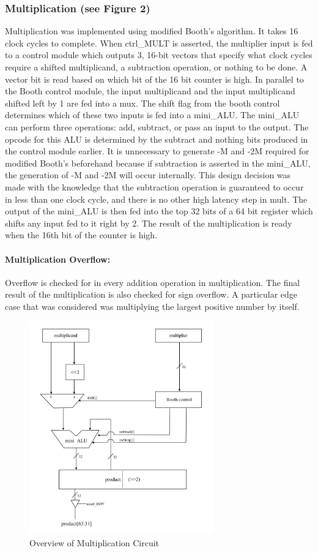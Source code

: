 \documentclass[letterpaper]{article}
\begin{document}
\subsubsection{Multiplication (see Figure 2)}
Multiplication was implemented using modified Booth's algorithm. It takes 16 clock cycles to complete. \newline 
When ctrl\_MULT is asserted, the multiplier input is fed to a control module which outputs 3, 16-bit vectors that specify what clock cycles require a shifted multiplicand, a subtraction operation, or nothing to be done. A vector bit is read based on which bit of the 16 bit counter is high. \newline
In parallel to the Booth control module, the input multiplicand and the input multiplicand shifted left by 1 are fed into a mux. The shift flag from the booth control determines which of these two inputs is fed into a mini\_ALU. The mini\_ALU can perform three operations: add, subtract, or pass an input to the output. The opcode for this ALU is determined by the subtract and nothing bits produced in the control module earlier. It is unnecessary to generate -M and -2M required for modified Booth's beforehand because if subtraction is asserted in the mini\_ALU, the generation of -M and -2M will occur internally. This design decision was made with the knowledge that the subtraction operation is guaranteed to occur in less than one clock cycle, and there is no other high latency step in mult.\newline
The output of the mini\_ALU is then fed into the top 32 bits of a 64 bit  register which shifts any input fed to it right by 2. The result of the multiplication is ready when the 16th bit of the counter is high.
\paragraph{Multiplication Overflow:}
Overflow is checked for in every addition operation in multiplication. The final result of the multiplication is also checked for sign overflow. A particular edge case that was considered was multiplying the largest positive number by itself.
\newline
\begin{figure}[h]
    \centering
    \includegraphics[width=8cm]{Multiply.png}
    \caption{Overview of Multiplication Circuit}
    \label{fig:my_label}
\end{figure}
\end{document}
